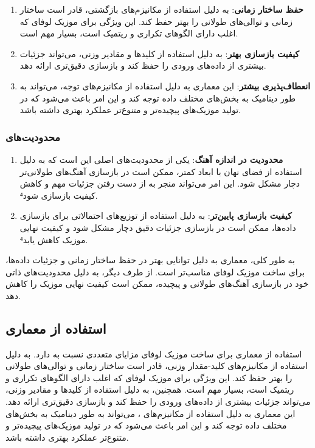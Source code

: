 \begin{enumerate}
\def\labelenumi{\arabic{enumi}.}
\item
  \textbf{حفظ ساختار زمانی}:  به دلیل استفاده از مکانیزم‌های بازگشتی،
  قادر است ساختار زمانی و توالی‌های طولانی را بهتر حفظ کند. این ویژگی
  برای موزیک لوفای که اغلب دارای الگوهای تکراری و ریتمیک است، بسیار مهم
  است.
\item
  \textbf{کیفیت بازسازی بهتر}:  به دلیل استفاده از کلیدها و مقادیر
  وزنی، می‌تواند جزئیات بیشتری از داده‌های ورودی را حفظ کند و بازسازی
  دقیق‌تری ارائه دهد.
\item
  \textbf{انعطاف‌پذیری بیشتر}: این معماری به دلیل استفاده از مکانیزم‌های
  توجه، می‌تواند به طور دینامیک به بخش‌های مختلف داده توجه کند و این امر
  باعث می‌شود که در تولید موزیک‌های پیچیده‌تر و متنوع‌تر عملکرد بهتری داشته
  باشد.
\end{enumerate}

\subsubsection{محدودیت‌های
}

\begin{enumerate}
\def\labelenumi{\arabic{enumi}.}
\item
  \textbf{محدودیت در اندازه آهنگ}: یکی از محدودیت‌های اصلی  این است که
  به دلیل استفاده از فضای نهان با ابعاد کمتر، ممکن است در بازسازی
  آهنگ‌های طولانی‌تر دچار مشکل شود. این امر می‌تواند منجر به از دست رفتن
  جزئیات مهم و کاهش کیفیت بازسازی شود⁴.
\item
  \textbf{کیفیت بازسازی پایین‌تر}:  به دلیل استفاده از توزیع‌های
  احتمالاتی برای بازسازی داده‌ها، ممکن است در بازسازی جزئیات دقیق دچار
  مشکل شود و کیفیت نهایی موزیک کاهش یابد⁴.
\end{enumerate}
به طور کلی، معماری  به دلیل توانایی بهتر در حفظ ساختار زمانی و
جزئیات داده‌ها، برای ساخت موزیک لوفای مناسب‌تر است. از طرف دیگر،  به
دلیل محدودیت‌های ذاتی خود در بازسازی آهنگ‌های طولانی و پیچیده، ممکن است
کیفیت نهایی موزیک را کاهش دهد.

\subsection{استفاده از معماری }

استفاده از معماری  برای ساخت موزیک لوفای مزایای متعددی نسبت به   دارد.  به دلیل استفاده از مکانیزم‌های کلید-مقدار وزنی، قادر است ساختار زمانی و توالی‌های طولانی را بهتر حفظ کند. این ویژگی برای موزیک لوفای که اغلب دارای الگوهای تکراری و ریتمیک است، بسیار مهم است. همچنین،  به دلیل استفاده از کلیدها و مقادیر وزنی، می‌تواند جزئیات بیشتری از داده‌های ورودی را حفظ کند و بازسازی دقیق‌تری ارائه دهد. این معماری به دلیل استفاده از مکانیزم‌های ، می‌تواند به طور دینامیک به بخش‌های مختلف داده توجه کند و این امر باعث می‌شود که در تولید موزیک‌های پیچیده‌تر و متنوع‌تر عملکرد بهتری داشته باشد.

